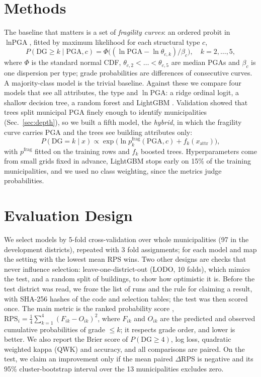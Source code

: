 \documentclass{article}
\begin{document}
\section{Methods}
The baseline that matters is a set of \emph{fragility curves}: an ordered probit in $\ln\text{PGA}$, fitted by
maximum likelihood \citep{baker2015} for each structural type $c$,
\begin{equation}
P(\text{DG}\ge k \mid \text{PGA}, c)=\Phi\big((\ln \text{PGA}-\ln\theta_{c,k})/\beta_c\big),\quad k=2,\dots,5,
\end{equation}
where $\Phi$ is the standard normal CDF, $\theta_{c,2}<\dots<\theta_{c,5}$ are median PGAs and $\beta_c$ is one
dispersion per type; grade probabilities are differences of consecutive curves. A majority-class model is the
trivial baseline. Against these we compare four models that see all attributes, the type and $\ln$PGA: a ridge
ordinal logit, a shallow decision tree, a random forest and LightGBM \citep{ke2017}. Validation showed that trees
split municipal PGA finely enough to identify municipalities (Sec.~\ref{sec:depth}), so we built a fifth model, the
\emph{hybrid}, in which the fragility curve carries PGA and the trees see building attributes only:
\begin{equation}
P(\text{DG}=k\mid x)\propto \exp\big(\ln p^{\text{frag}}_k(\text{PGA},c)+f_k(x_{\text{attr}})\big),
\end{equation}
with $p^{\text{frag}}$ fitted on the training rows and $f_k$ boosted trees. Hyperparameters come from small grids
fixed in advance, LightGBM stops early on 15\% of the training municipalities, and we used no class weighting,
since the metrics judge probabilities.

\section{Evaluation Design}
We select models by 5-fold cross-validation over whole municipalities (97 in the development districts), repeated
with 3 fold assignments; for each model and map the setting with the lowest mean RPS wins. Two other designs are
checks that never influence selection: leave-one-district-out (LODO, 10 folds), which mimics the test, and a
random split of buildings, to show how optimistic it is. Before the test district was read, we froze the list of
runs and the rule for claiming a result, with SHA-256 hashes of the code and selection tables; the test was then
scored once. The main metric is the ranked probability score \citep{epstein1969},
$\text{RPS}_i=\frac{1}{4}\sum_{k=1}^{4}(F_{ik}-O_{ik})^2$, where $F_{ik}$ and $O_{ik}$ are the predicted and
observed cumulative probabilities of grade $\le k$; it respects grade order, and lower is better. We also report
the Brier score of $P(\text{DG}\ge4)$, log loss, quadratic weighted kappa (QWK) and accuracy, and all comparisons
are paired. On the test, we claim an improvement only if the mean paired $\Delta$RPS is negative and its 95\%
cluster-bootstrap interval over the 13 municipalities excludes zero.
\end{document}

